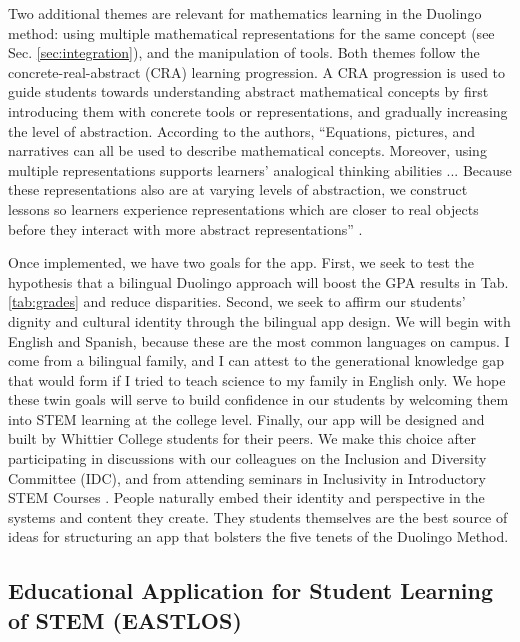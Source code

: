 \documentclass[10pt]{amsart}
\theoremstyle{definition}
\numberwithin{equation}{section}
\begin{document}
Two additional themes are relevant for mathematics learning in the Duolingo method: using multiple mathematical representations for the same concept (see Sec. \ref{sec:integration}), and the manipulation of tools.  Both themes follow the concrete-real-abstract (CRA) learning progression.  A CRA progression is used to guide students towards understanding abstract mathematical concepts by first introducing them with concrete tools or representations, and gradually increasing the level of abstraction.  According to the authors, ``Equations, pictures, and narratives can all be used to describe mathematical concepts.  Moreover, using multiple representations supports learners' analogical thinking abilities ... Because these representations also are at varying levels of abstraction, we construct lessons so learners experience representations which are closer to real objects before they interact with more abstract representations'' \cite{duolingo_whitepaper}. 

Once implemented, we have two goals for the app.  First, we seek to test the hypothesis that a bilingual Duolingo approach will boost the GPA results in Tab. \ref{tab:grades} and reduce disparities.  Second, we seek to affirm our students' dignity and cultural identity through the bilingual app design.  We will begin with English and Spanish, because these are the most common languages on campus.  I come from a bilingual family, and I can attest to the generational knowledge gap that would form if I tried to teach science to my family in English only.  We hope these twin goals will serve to build confidence in our students by welcoming them into STEM learning at the college level.  Finally, our app will be designed and built by Whittier College students for their peers.  We make this choice after participating in discussions with our colleagues on the Inclusion and Diversity Committee (IDC), and from attending seminars in Inclusivity in Introductory STEM Courses \cite{cottrell1,cottrell2}.  People naturally embed their identity and perspective in the systems and content they create.  They students themselves are the best source of ideas for structuring an app that bolsters the five tenets of the Duolingo Method.  

\subsection{Educational Application for Student Learning of STEM (EASTLOS)}
\end{document}
